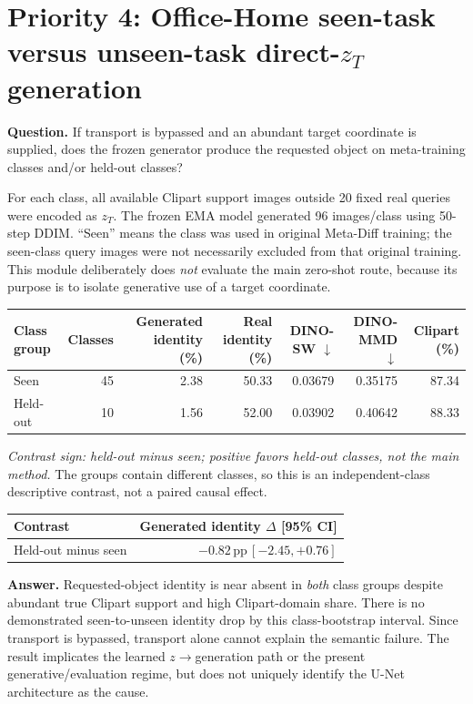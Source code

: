 \documentclass[10pt]{article}
\newcommand{\pp}{\,\mathrm{pp}}
\begin{document}
\section*{Priority 4: Office-Home seen-task versus unseen-task direct-$z_T$ generation}

\textbf{Question.} If transport is bypassed and an abundant target coordinate is supplied, does the frozen generator produce the requested object on meta-training classes and/or held-out classes?

For each class, all available Clipart support images outside 20 fixed real queries were encoded as $z_T$. The frozen EMA model generated 96 images/class using 50-step DDIM. ``Seen'' means the class was used in original Meta-Diff training; the seen-class query images were not necessarily excluded from that original training. This module deliberately does \emph{not} evaluate the main zero-shot route, because its purpose is to isolate generative use of a target coordinate.

\begin{center}\small
\begin{tabular}{lrrrrrr}
\toprule
Class group & Classes & Generated identity (\%) & Real identity (\%) & DINO-SW $\downarrow$ & DINO-MMD $\downarrow$ & Clipart (\%)\\
\midrule
Seen & 45 & 2.38 & 50.33 & 0.03679 & 0.35175 & 87.34\\
Held-out & 10 & 1.56 & 52.00 & 0.03902 & 0.40642 & 88.33\\
\bottomrule
\end{tabular}
\end{center}

\emph{Contrast sign: held-out minus seen; positive favors held-out classes, not the main method.} The groups contain different classes, so this is an independent-class descriptive contrast, not a paired causal effect.

\begin{center}\small
\begin{tabular}{lr}
\toprule
Contrast & Generated identity $\Delta$ [95\% CI]\\
\midrule
Held-out minus seen & $-0.82\pp\,[-2.45,+0.76]$\\
\bottomrule
\end{tabular}
\end{center}

\textbf{Answer.} Requested-object identity is near absent in \emph{both} class groups despite abundant true Clipart support and high Clipart-domain share. There is no demonstrated seen-to-unseen identity drop by this class-bootstrap interval. Since transport is bypassed, transport alone cannot explain the semantic failure. The result implicates the learned $z\!\to\!$generation path or the present generative/evaluation regime, but does not uniquely identify the U-Net architecture as the cause.
\end{document}
